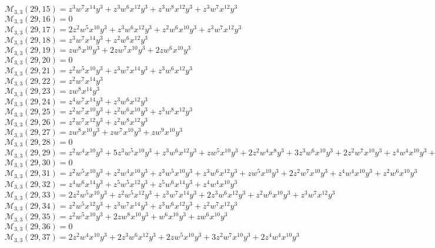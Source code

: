 \documentclass[12pt]{memoireuqam1.3}
\begin{document}
$\mathcal{M}_{3,3}(29,15)=z^3w^7x^{14}y^3+z^3w^6x^{12}y^3+z^3w^8x^{12}y^3+z^3w^7x^{12}y^3$\\
$\mathcal{M}_{3,3}(29,16)=0$\\
$\mathcal{M}_{3,3}(29,17)=2z^2w^5x^{10}y^3+z^3w^6x^{12}y^3+z^2w^6x^{10}y^3+z^3w^7x^{12}y^3$\\
$\mathcal{M}_{3,3}(29,18)=z^3w^7x^{14}y^3+z^2w^6x^{12}y^3$\\
$\mathcal{M}_{3,3}(29,19)=zw^8x^{10}y^3+2zw^7x^{10}y^3+2zw^6x^{10}y^3$\\
$\mathcal{M}_{3,3}(29,20)=0$\\
$\mathcal{M}_{3,3}(29,21)=z^2w^5x^{10}y^3+z^3w^7x^{14}y^3+z^3w^6x^{12}y^3$\\
$\mathcal{M}_{3,3}(29,22)=z^2w^7x^{14}y^3$\\
$\mathcal{M}_{3,3}(29,23)=zw^8x^{14}y^3$\\
$\mathcal{M}_{3,3}(29,24)=z^4w^7x^{14}y^3+z^3w^6x^{12}y^3$\\
$\mathcal{M}_{3,3}(29,25)=z^2w^7x^{10}y^3+z^2w^6x^{10}y^3+z^3w^8x^{12}y^3$\\
$\mathcal{M}_{3,3}(29,26)=z^2w^7x^{12}y^3+z^2w^8x^{12}y^3$\\
$\mathcal{M}_{3,3}(29,27)=zw^8x^{10}y^3+zw^7x^{10}y^3+zw^9x^{10}y^3$\\
$\mathcal{M}_{3,3}(29,28)=0$\\
$\mathcal{M}_{3,3}(29,29)=z^2w^4x^{10}y^3+5z^3w^5x^{10}y^3+z^3w^6x^{12}y^3+zw^5x^{10}y^3+2z^2w^4x^8y^3+3z^3w^6x^{10}y^3+2z^2w^7x^{10}y^3+z^4w^4x^{10}y^3+z^2w^5x^8y^3$\\
$\mathcal{M}_{3,3}(29,30)=0$\\
$\mathcal{M}_{3,3}(29,31)=z^2w^5x^{10}y^3+z^2w^4x^{10}y^3+z^3w^5x^{10}y^3+z^3w^6x^{12}y^3+zw^5x^{10}y^3+2z^2w^7x^{10}y^3+z^4w^4x^{10}y^3+z^2w^6x^{10}y^3$\\
$\mathcal{M}_{3,3}(29,32)=z^4w^6x^{14}y^3+z^5w^5x^{12}y^3+z^5w^6x^{14}y^3+z^4w^4x^{10}y^3$\\
$\mathcal{M}_{3,3}(29,33)=2z^2w^5x^{10}y^3+z^2w^5x^{12}y^3+z^3w^7x^{14}y^3+2z^3w^6x^{12}y^3+z^2w^6x^{10}y^3+z^3w^7x^{12}y^3$\\
$\mathcal{M}_{3,3}(29,34)=z^2w^5x^{12}y^3+z^3w^7x^{14}y^3+z^3w^6x^{12}y^3+z^2w^7x^{12}y^3$\\
$\mathcal{M}_{3,3}(29,35)=z^2w^5x^{10}y^3+2zw^8x^{10}y^3+w^6x^{10}y^3+zw^6x^{10}y^3$\\
$\mathcal{M}_{3,3}(29,36)=0$\\
$\mathcal{M}_{3,3}(29,37)=2z^2w^4x^{10}y^3+2z^3w^6x^{12}y^3+2zw^5x^{10}y^3+3z^2w^7x^{10}y^3+2z^4w^4x^{10}y^3$\\
\end{document}
